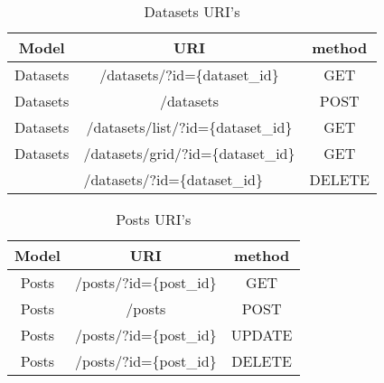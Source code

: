 \begin{table}[]
\centering
\begin{tabular}{|c|c|c|}
\hline
\rowcolor[HTML]{32CB00} 
\textbf{Model}                                         & \textbf{URI}                                                               & \textbf{method}                                     \\ \hline
\rowcolor[HTML]{FFFFFF} 
Datasets                                               & /datasets/?id=\{dataset\_id\}                                              & GET                                                 \\ \hline
\rowcolor[HTML]{67FD9A} 
Datasets                                               & /datasets                                                                  & POST                                                \\ \hline
\rowcolor[HTML]{FFFFFF} 
Datasets                                               & /datasets/list/?id=\{dataset\_id\}                                         & GET                                                 \\ \hline
\rowcolor[HTML]{67FD9A} 
Datasets                                               & /datasets/grid/?id=\{dataset\_id\}                                         & GET                                                 \\ \hline
\rowcolor[HTML]{FFFFFF} 
\multicolumn{1}{|l|}{\cellcolor[HTML]{FFFFFF}Datasets} & \multicolumn{1}{l|}{\cellcolor[HTML]{FFFFFF}/datasets/?id=\{dataset\_id\}} & \multicolumn{1}{l|}{\cellcolor[HTML]{FFFFFF}DELETE} \\ \hline
\end{tabular}
\caption{Datasets URI's}
\label{datasetsURI}
\end{table}



\begin{table}[]
\centering
\begin{tabular}{|c|c|c|}
\hline
\rowcolor[HTML]{32CB00} 
\textbf{Model} & \textbf{URI}            & \textbf{method} \\ \hline
\rowcolor[HTML]{FFFFFF} 
Posts          & /posts/?id=\{post\_id\} & GET             \\ \hline
\rowcolor[HTML]{67FD9A} 
Posts          & /posts                  & POST            \\ \hline
\rowcolor[HTML]{FFFFFF} 
Posts          & /posts/?id=\{post\_id\} & UPDATE          \\ \hline
\rowcolor[HTML]{67FD9A} 
Posts          & /posts/?id=\{post\_id\} & DELETE          \\ \hline
\end{tabular}
\caption{Posts URI's}
\label{postsURI}
\end{table}



